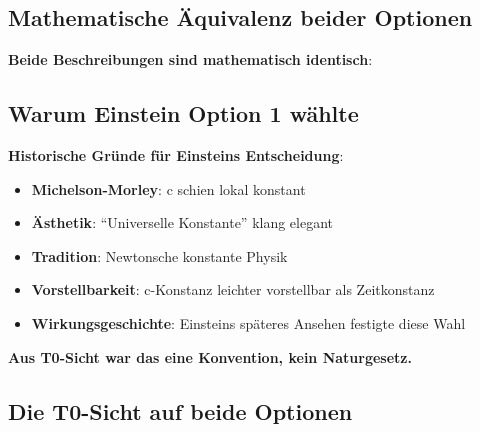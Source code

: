 	\subsection{Mathematische Äquivalenz beider Optionen}
	
	\textbf{Beide Beschreibungen sind mathematisch identisch}:
	
	\begin{table}[htbp]
		\centering
		\caption{Zwei Sichten, identische Physik}
	\end{table}
	
	\subsection{Warum Einstein Option 1 wählte}
	
	\textbf{Historische Gründe für Einsteins Entscheidung}:
	\begin{itemize}
		\item \textbf{Michelson-Morley}: c schien lokal konstant
		\item \textbf{Ästhetik}: ``Universelle Konstante'' klang elegant
		\item \textbf{Tradition}: Newtonsche konstante Physik
		\item \textbf{Vorstellbarkeit}: c-Konstanz leichter vorstellbar als Zeitkonstanz
		\item \textbf{Wirkungsgeschichte}: Einsteins späteres Ansehen festigte diese Wahl
	\end{itemize}
	
	\textbf{Aus T0-Sicht war das eine Konvention, kein Naturgesetz.}
	
	\subsection{Die T0-Sicht auf beide Optionen}
	
